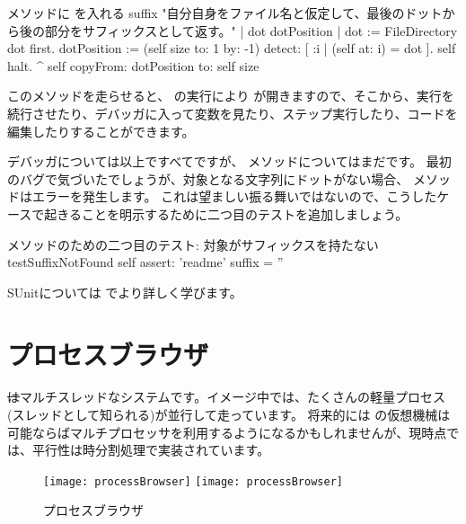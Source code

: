\documentclass[a4paper,10pt,twoside]{book}
\begin{document}
\needspace{11ex}
\begin{method}[suffix]{ メソッドに  を入れる}
suffix
"自分自身をファイル名と仮定して、最後のドットから後の部分をサフィックスとして返す。"
| dot dotPosition |
dot := FileDirectory dot first.
dotPosition := (self size to: 1 by: -1) detect: [ :i | (self at: i) = dot ].
self halt.
^ self copyFrom: dotPosition to: self size
\end{method}

このメソッドを走らせると、  の実行により  が開きますので、そこから、実行を続行させたり、デバッガに入って変数を見たり、ステップ実行したり、コードを編集したりすることができます。

デバッガについては以上ですべてですが、  メソッドについてはまだです。
最初のバグで気づいたでしょうが、対象となる文字列にドットがない場合、 メソッドはエラーを発生します。
これは望ましい振る舞いではないので、こうしたケースで起きることを明示するために二つ目のテストを追加しましょう。

\begin{method}[testNoSuffix]{ メソッドのための二つ目のテスト: 対象がサフィックスを持たない}
testSuffixNotFound
self assert: 'readme' suffix = ''
\end{method}


SUnitについては  でより詳しく学びます。


\section{プロセスブラウザ}

\st はマルチスレッドなシステムです。イメージ中では、たくさんの軽量プロセス(スレッドとして知られる)が並行して走っています。
将来的には \pharo の仮想機械は可能ならばマルチプロセッサを利用するようになるかもしれませんが、現時点では、平行性は時分割処理で実装されています。

\begin{figure}[btp]
\begin{center}
\ifluluelse
{\texttt{[image: processBrowser]}}
{\texttt{[image: processBrowser]}}
\end{center}
\caption{プロセスブラウザ}
\end{figure}
\end{document}
